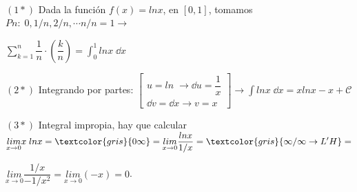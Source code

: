 $\quad$

\small{$(1*)$} Dada la función $f(x)=ln x$, en $[0,1]$, tomamos $Pn:\; 0, 1/n, 2/n, \cdots n/n=1 \to$

$ \displaystyle \sum_{k=1}^n \dfrac 1 n \cdot \left( \dfrac k n \right) = \int_0^1 lnx\; \dd x$

$(2*)$ Integrando por partes: $\left[ \begin{matrix} u=ln\; \to \dd u= \dfrac 1 x \\ \dd v = \dd x \to v=x  \end{matrix} \right] \to \displaystyle \int ln x \; \dd x = xln x-x+\mathcal C$

$(3*)$ Integral impropia, hay que calcular $\displaystyle \underset {x\to 0}{lim} x\; ln x =\textcolor{gris}{0\infty}=\underset {x\to 0}{lim} \dfrac {ln x}{1/x}=\textcolor{gris}{\infty / \infty \to L'H}= $ 

$\displaystyle \underset {x\to 0}{lim} \dfrac {1/x}{-1/x^2}=\underset {x\to 0}{lim} (-x)=0$\normalsize{.}
	

	
